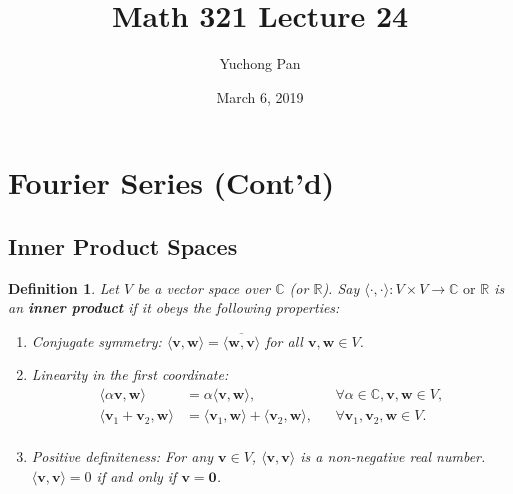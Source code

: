 \documentclass[letterpaper, reqno,11pt]{article}
\newcommand{\RR}{\mathbb{R}}
\newcommand{\CC}{\mathbb{C}}
\begin{document}
\title{Math 321 Lecture 24}
\author{Yuchong Pan}
\date{March 6, 2019}
\newtheorem{thm}{Theorem}
\newtheorem{defn}{Definition}
\newtheorem*{remark}{Remark}
\newtheorem{claim}{Claim}
\newtheorem{cor}{Corollary}
\newtheorem{lemma}{Lemma}
\newtheorem{prop}{Proposition}
\newtheorem{fact}{Fact}
\maketitle
%

\section{Fourier Series (Cont'd)}

\subsection{Inner Product Spaces}

\begin{defn}
  \normalfont Let $V$ be a vector space over $\CC$ (or $\RR$). Say $\langle \cdot, \cdot \rangle : V \times V \to \CC \text{ or $\RR$}$ is an {\bf inner product} if it obeys the following properties:
  \begin{enumerate}
  \item Conjugate symmetry: $\langle \mathbf v, \mathbf w \rangle = \overline{\langle \mathbf w, \mathbf v \rangle}$ for all $\mathbf v, \mathbf w \in V$.
  \item Linearity in the first coordinate:
    \begin{align*}
      \langle \alpha \mathbf v, \mathbf w \rangle &= \alpha \langle \mathbf v, \mathbf w \rangle, && \forall \alpha \in \CC, \mathbf v, \mathbf w \in V, \\
      \langle \mathbf v_1 + \mathbf v_2, \mathbf w \rangle &= \langle \mathbf v_1, \mathbf w \rangle + \langle \mathbf v_2, \mathbf w \rangle, && \forall \mathbf v_1, \mathbf v_2, \mathbf w \in V. \\
    \end{align*}
  \item Positive definiteness: For any $\mathbf v \in V$, $\langle \mathbf v, \mathbf v \rangle$ is a non-negative real number. $\langle \mathbf v, \mathbf v \rangle = 0$ if and only if $\mathbf v = \mathbf 0$.
  \end{enumerate}
\end{defn}
\end{document}
